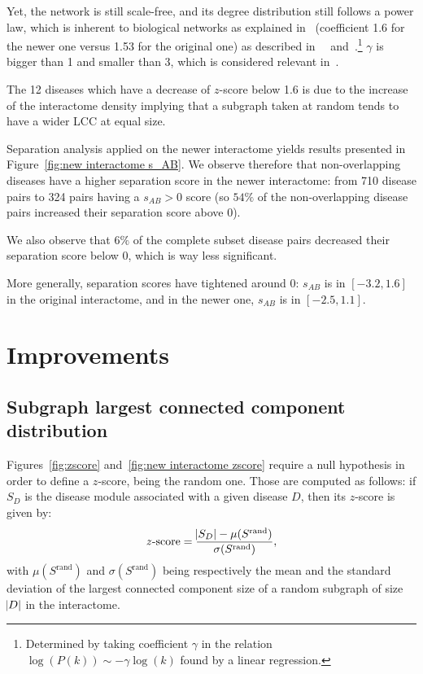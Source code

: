 \documentclass[letterpaper]{article}
\begin{document}
	Yet, the network is still scale-free, and its degree distribution still follows a power law, which is inherent to
	biological networks as explained in~\cite{InteractomeNetworksAndHumanDisease} (coefficient 1.6 for the newer one
	versus 1.53 for the original one) as described in~~\cite{UnderstandingTheCellFunctionalOrganization}
	and~\cite{ProteinProteinInteractionNetworks}.\footnote{Determined by taking coefficient $\gamma$ in the relation
	$\log(P(k)) \sim -\gamma\log(k)$ found by a linear regression.} $\gamma$ is bigger than 1 and smaller than 3, which
	is considered relevant in~\cite{UnderstandingTheCellFunctionalOrganization}.

	The 12 diseases which have a decrease of $z$-score below 1.6 is due to the increase of the interactome density implying
	that a subgraph taken at random tends to have a wider LCC at equal size.

	Separation analysis applied on the newer interactome yields results presented in Figure~\ref{fig:new interactome s_AB}.
	We observe therefore that non-overlapping diseases have a higher separation score in the newer interactome: from 710
	disease pairs to 324 pairs having a $s_{AB} > 0$ score (so $54\%$ of the non-overlapping disease pairs increased their
	separation score above 0).

	We also observe that $6\%$ of the complete subset disease pairs decreased their separation score below 0, which is way
	less significant.

	More generally, separation scores have tightened around 0: $s_{AB}$ is in $[-3.2, 1.6]$ in the original interactome, and
	in the newer one, $s_{AB}$ is in $[-2.5, 1.1]$.

\section{Improvements}

	\subsection{Subgraph largest connected component distribution}
	Figures~\ref{fig:zscore} and~\ref{fig:new interactome zscore} require a null hypothesis in order to define a $z$-score,
	being the random one. Those are computed as follows: if $S_D$ is the disease module associated with a given disease $D$,
	then its $z$-score is given by:
	\begin{equation}
		z\text{-score} = \frac {\abs {S_D} - \mu(S^{\text{rand}})}{\sigma(S^{\text{rand}})},
	\end{equation}
	with $\mu(S^{\text{rand}})$ and $\sigma(S^{\text{rand}})$ being respectively the mean and the
	standard deviation of the largest connected component size of a random subgraph of size $\abs D$
	in the interactome.
\end{document}
